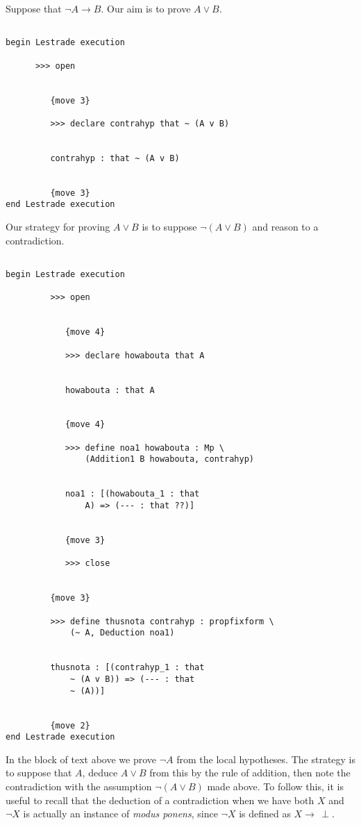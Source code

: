 \documentclass[12pt]{article}
\begin{document}
Suppose that $\neg A \rightarrow B$.  Our aim is to prove $A \vee B$.

\begin{verbatim}

begin Lestrade execution

      >>> open


         {move 3}

         >>> declare contrahyp that ~ (A v B)


         contrahyp : that ~ (A v B)


         {move 3}
end Lestrade execution
\end{verbatim}

Our strategy for proving $A \vee B$ is to suppose $\neg(A \vee B)$ and reason to a contradiction.

\begin{verbatim}

begin Lestrade execution

         >>> open


            {move 4}

            >>> declare howabouta that A


            howabouta : that A


            {move 4}

            >>> define noa1 howabouta : Mp \
                (Addition1 B howabouta, contrahyp)


            noa1 : [(howabouta_1 : that 
                A) => (--- : that ??)]


            {move 3}

            >>> close


         {move 3}

         >>> define thusnota contrahyp : propfixform \
             (~ A, Deduction noa1)


         thusnota : [(contrahyp_1 : that 
             ~ (A v B)) => (--- : that 
             ~ (A))]


         {move 2}
end Lestrade execution
\end{verbatim}

In the block of text above we prove $\neg A$ from the local hypotheses.  The strategy is to suppose that $A$, deduce $A \vee B$ from this by 
the rule of addition, then note the contradiction with the assumption $\neg (A \vee B)$ made above.  To follow this, it is useful to recall that the 
deduction of a contradiction when we have both $X$ and $\neg X$ is actually an instance of {\em modus ponens\/}, since $\neg X$ is defined
as $X \rightarrow \,\perp$.
\end{document}
